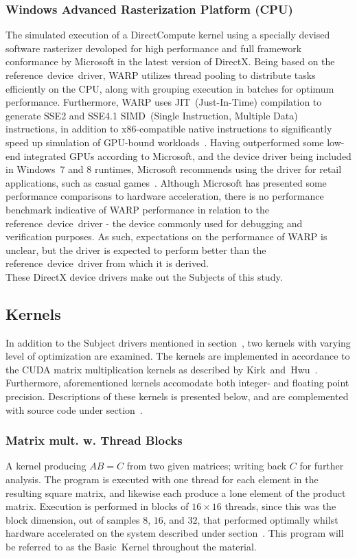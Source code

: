 \subsubsection{Windows Advanced Rasterization Platform (CPU)}
The simulated execution of a DirectCompute kernel using a specially devised software rasterizer devoloped for high performance and full framework conformance by Microsoft in the latest version of DirectX.
Being based on the reference~device~driver, WARP utilizes thread pooling to distribute tasks efficiently on the CPU, along with grouping execution in batches for optimum performance.
Furthermore, WARP uses JIT~(Just-In-Time) compilation to generate SSE2 and SSE4.1 SIMD~(Single Instruction, Multiple Data) instructions, in addition to x86-compatible native instructions to significantly speed up simulation of GPU-bound workloads~.
Having outperformed some low-end integrated GPUs according to Microsoft, and the device driver being included in Windows~7 and 8 runtimes, Microsoft recommends using the driver for retail applications, such as casual games~.
Although Microsoft has presented some performance comparisons to hardware acceleration, there is no performance benchmark indicative of WARP performance in relation to the reference~device~driver - the device commonly used for debugging and verification purposes.
As such, expectations on the performance of WARP is unclear, but the driver is expected to perform better than the reference~device~driver from which it is derived.\\

These DirectX device drivers make out the Subjects of this study.

\subsection{Kernels}
\label{sec:contribution:kernels}
In addition to the Subject drivers mentioned in section~, two kernels with varying level of optimization are examined.
The kernels are implemented in accordance to the CUDA matrix multiplication kernels as described by Kirk~and~Hwu~\cite[p.~67, p.~87]{Kirk:2010:PMP:1841511}.
Furthermore, aforementioned kernels accomodate both integer- and floating point precision.
Descriptions of these kernels is presented below, and are complemented with source code under section~.

\subsubsection{Matrix mult. w. Thread Blocks}
A kernel producing $AB=C$ from two given matrices; writing back $C$ for further analysis.
The program is executed with one thread for each element in the resulting square matrix, and likewise each produce a lone element of the product matrix.
Execution is performed in blocks of $16\times 16$ threads, since this was the block dimension, out of samples $8$, $16$, and $32$, that performed optimally whilst hardware accelerated on the system described under section~.
This program will be referred to as the Basic~Kernel throughout the material.

